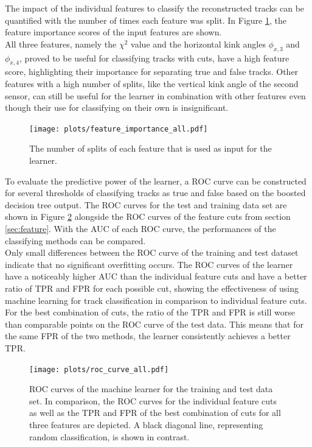 The impact of the individual features to classify the reconstructed tracks can be quantified with the number of times each feature was split.
In Figure \ref{fig:importance}, the feature importance scores of the input features are shown. \\
All three features, namely the $\chi^2$ value and the horizontal kink angles  $\phi_{x,3}$ and $\phi_{x,4}$,
proved to be useful for classifying tracks with cuts, have a high feature score, highlighting their importance for separating true and false tracks.
Other features with a high number of splits, like the vertical kink angle of the second sensor,
can still be useful for the learner in combination with other features even though their use for classifying on their own is insignificant.
\begin{figure}
  \centering
  \texttt{[image: plots/feature\_importance\_all.pdf]}
  \caption{The number of splits of each feature that is used as input for the learner.}
  \label{fig:importance}
\end{figure}

To evaluate the predictive power of the learner, a ROC curve can be constructed for several thresholds of classifying tracks as true and false based on the
boosted decision tree output.
The ROC curves for the test and training data set are shown in Figure \ref{fig:auc_comparison} alongside
the ROC curves of the feature cuts from section \ref{sec:feature}.
With the AUC of each ROC curve, the performances of the classifying methods can be compared. \\%
Only small differences between the ROC curve of the training and test dataset indicate that no significant overfitting occurs.
The ROC curves of the learner have a noticeably higher AUC than the individual feature cuts and have a better ratio of
TPR and FPR for each possible cut, showing the effectiveness
of using machine learning for track classification in comparison to individual feature cuts. For the best combination of cuts, the ratio of the TPR and FPR is still worse than
comparable points on the ROC curve of the test data. This means that for the same FPR of the two methods, the learner consistently achieves a better TPR.

\begin{figure}[H]
  \centering
  \texttt{[image: plots/roc\_curve\_all.pdf]}
    \caption{ROC curves of the machine learner for the training and test data set. In comparison, the ROC curves for the individual feature cuts as well as the
    TPR and FPR of the best combination of cuts for all three features are depicted. A black diagonal line, representing random classification, is shown
    in contrast.}
  \label{fig:auc_comparison}
\end{figure}

